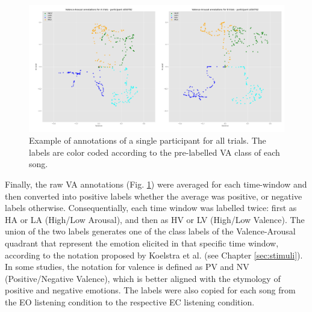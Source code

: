 \begin{figure}[h!]
\includegraphics[width=15cm]{img/methods/example_avg_annotations.png}
\centering
\caption{Example of annotations of a single participant for all trials. The labels are color coded according to the pre-labelled VA class of each song.} \label{fig_avg_annotations}
\end{figure}

Finally, the raw VA annotations (Fig. \ref{fig_avg_annotations}) were averaged for each time-window and then converted into positive labels whether the average was positive, or negative labels otherwise. Consequentially, each time window was labelled twice: first as HA or LA (High/Low Arousal), and then as HV or LV (High/Low Valence). The union of the two labels generates one of the class labels of the Valence-Arousal quadrant that represent the emotion elicited in that specific time window, according to the notation proposed by Koelstra et al. \cite{koelstra_deap_2012} (see Chapter \ref{sec:stimuli}). In some studies, the notation for valence is defined as PV and NV (Positive/Negative Valence), which is better aligned with the etymology of positive and negative emotions. The labels were also copied for each song from the \ac{EO} listening condition to the respective \ac{EC} listening condition.

